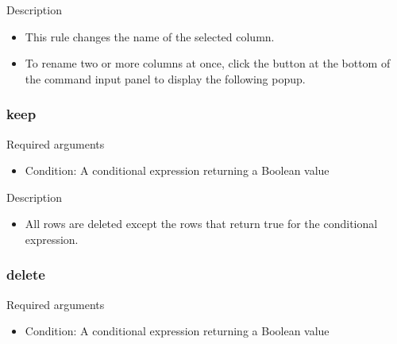 \documentclass[letterpaper,10pt,english]{sphinxmanual}
\begin{document}
Description
\begin{itemize}
\item {} 
This rule changes the name of the selected column.

\item {} 
To rename two or more columns at once, click the  button at the bottom of the command input panel to display the following popup.
\begin{quote}

\begin{figure}[H]
\centering

\noindent{}
\end{figure}
\end{quote}

\end{itemize}


\subsubsection{keep}
\label{\detokenize{discovery/part07/rule_kinds:keep}}
Required arguments
\begin{itemize}
\item {} 
Condition: A conditional expression returning a Boolean value

\end{itemize}

Description
\begin{itemize}
\item {} 
All rows are deleted except the rows that return true for the conditional expression.
\begin{quote}

\begin{figure}[H]
\centering

\noindent{}
\end{figure}
\end{quote}

\end{itemize}


\subsubsection{delete}
\label{\detokenize{discovery/part07/rule_kinds:delete}}
Required arguments
\begin{itemize}
\item {} 
Condition: A conditional expression returning a Boolean value

\end{itemize}
\end{document}
